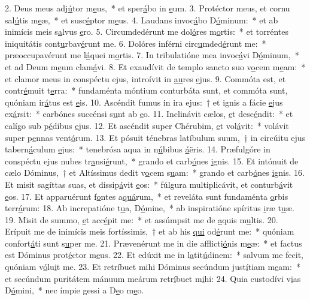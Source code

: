 2. Deus meus adj\uline{ú}tor m\uline{e}us,~* et sper\uline{á}bo in \uline{e}um.
3. Protéctor meus, et cornu sal\uline{ú}tis m\uline{e}æ,~* et susc\uline{é}ptor m\uline{e}us.
4. Laudans invoc\uline{á}bo D\uline{ó}minum:~* et ab inimícis meis s\uline{a}lvus \uline{e}ro.
5. Circumdedérunt me dol\uline{ó}res m\uline{o}rtis:~* et torréntes iniquitátis cont\uline{u}rbav\uline{é}runt me.
6. Dolóres inférni circ\uline{u}mded\uline{é}runt me:~* præoccupavérunt me l\uline{á}quei m\uline{o}rtis.
7. In tribulatióne mea invoc\uline{á}vi D\uline{ó}minum,~* et ad Deum m\uline{e}um clam\uline{á}vi.
8. Et exaudívit de templo sancto suo v\uline{o}cem m\uline{e}am:~* et clamor meus in conspéctu ejus, introívit in \uline{au}res \uline{e}jus.
9. Commóta est, et contr\uline{é}muit t\uline{e}rra:~* fundaménta móntium conturbáta sunt, et commóta sunt, quóniam ir\uline{á}tus est \uline{e}is.
10. Ascéndit fumus in ira ejus:~† et ignis a fácie \uline{e}jus ex\uline{á}rsit:~* carbónes succénsi s\uline{u}nt ab \uline{e}o.
11. Inclinávit cælos, \uline{e}t desc\uline{é}ndit:~* et calígo sub p\uline{é}dibus \uline{e}jus.
12. Et ascéndit super Chérubim, \uline{e}t vol\uline{á}vit:~* volávit super p\uline{e}nnas vent\uline{ó}rum.
13. Et pósuit ténebras latíbulum suum,~† in circúitu ejus tabern\uline{á}culum \uline{e}jus:~* tenebrósa aqua in n\uline{ú}bibus \uline{á}ëris.
14. Præfulgóre in conspéctu ejus nubes tr\uline{a}nsi\uline{é}runt,~* grando et carb\uline{ó}nes \uline{i}gnis.
15. Et intónuit de cælo Dóminus,~† et Altíssimus dedit v\uline{o}cem s\uline{u}am:~* grando et carb\uline{ó}nes \uline{i}gnis.
16. Et misit sagíttas suas, et dissip\uline{á}vit \uline{e}os:~* fúlgura multiplicávit, et conturb\uline{á}vit \uline{e}os.
17. Et apparuérunt f\uline{o}ntes a\uline{quá}rum,~* et reveláta sunt fundaménta \uline{o}rbis terr\uline{á}rum:
18. Ab increpatióne t\uline{u}a, D\uline{ó}mine,~* ab inspiratióne spíritus \uline{i}ræ t\uline{u}æ.
19. Misit de summo, \uline{e}t acc\uline{é}pit me:~* et assúmpsit me de \uline{a}quis m\uline{u}ltis.
20. Erípuit me de inimícis meis fortíssimis,~† et ab his \uline{qui} od\uline{é}runt me:~* quóniam confort\uline{á}ti sunt s\uline{u}per me.
21. Prævenérunt me in die afflicti\uline{ó}nis m\uline{e}æ:~* et factus est Dóminus prot\uline{é}ctor m\uline{e}us.
22. Et edúxit me in l\uline{a}tit\uline{ú}dinem:~* salvum me fecit, quóniam v\uline{ó}lu\uline{i}t me.
23. Et retríbuet mihi Dóminus secúndum just\uline{í}tiam m\uline{e}am:~* et secúndum puritátem mánuum meárum retr\uline{í}buet m\uline{i}hi:
24. Quia custodívi v\uline{i}as D\uline{ó}mini,~* nec ímpie gessi a D\uline{e}o m\uline{e}o.
